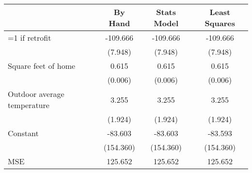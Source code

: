 \begin{tabular}{lccc}
\toprule
 & By Hand & Stats Model & Least Squares \\
\midrule
=1 if retrofit & -109.666 & -109.666 & -109.666 \\
  & (7.948) & (7.948) & (7.948) \\
Square feet of home & 0.615 & 0.615 & 0.615 \\
  & (0.006) & (0.006) & (0.006) \\
Outdoor average temperature & 3.255 & 3.255 & 3.255 \\
  & (1.924) & (1.924) & (1.924) \\
Constant & -83.603 & -83.603 & -83.593 \\
  & (154.360) & (154.360) & (154.360) \\
MSE & 125.652 & 125.652 & 125.652 \\
\bottomrule
\end{tabular}
